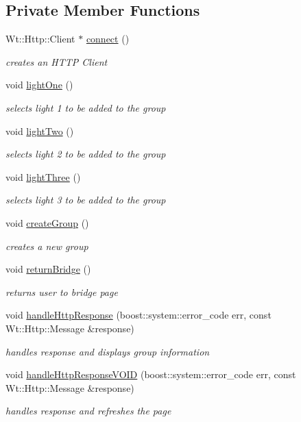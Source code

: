 \subsection*{Private Member Functions}
\begin{DoxyCompactItemize}
\item 
Wt\+::\+Http\+::\+Client $\ast$ \hyperlink{classGroupsControlWidget_ac6dc70e7eccf6d30701c15d625424c0c}{connect} ()
\begin{DoxyCompactList}\small\item\em creates an H\+T\+TP Client \end{DoxyCompactList}\item 
void \hyperlink{classGroupsControlWidget_a801b235a88f796198f1a65fcbe13c725}{light\+One} ()
\begin{DoxyCompactList}\small\item\em selects light 1 to be added to the group \end{DoxyCompactList}\item 
void \hyperlink{classGroupsControlWidget_a28fa2a1848d1358587a37651861be081}{light\+Two} ()
\begin{DoxyCompactList}\small\item\em selects light 2 to be added to the group \end{DoxyCompactList}\item 
void \hyperlink{classGroupsControlWidget_aaa514da760a67d4bf3e1ab7e51ea08f0}{light\+Three} ()
\begin{DoxyCompactList}\small\item\em selects light 3 to be added to the group \end{DoxyCompactList}\item 
void \hyperlink{classGroupsControlWidget_a891bad4ba589f7bd7be8cb09a0910f20}{create\+Group} ()
\begin{DoxyCompactList}\small\item\em creates a new group \end{DoxyCompactList}\item 
void \hyperlink{classGroupsControlWidget_a4fd7d26972133feb20b6941dc191535f}{return\+Bridge} ()
\begin{DoxyCompactList}\small\item\em returns user to bridge page \end{DoxyCompactList}\item 
void \hyperlink{classGroupsControlWidget_ad5282b45d7e299bdac0813a8a72f6d3a}{handle\+Http\+Response} (boost\+::system\+::error\+\_\+code err, const Wt\+::\+Http\+::\+Message \&response)
\begin{DoxyCompactList}\small\item\em handles response and displays group information \end{DoxyCompactList}\item 
void \hyperlink{classGroupsControlWidget_ade80d514e591c307c4cc6c0fbb758896}{handle\+Http\+Response\+V\+O\+ID} (boost\+::system\+::error\+\_\+code err, const Wt\+::\+Http\+::\+Message \&response)
\begin{DoxyCompactList}\small\item\em handles response and refreshes the page \end{DoxyCompactList}\end{DoxyCompactItemize}
